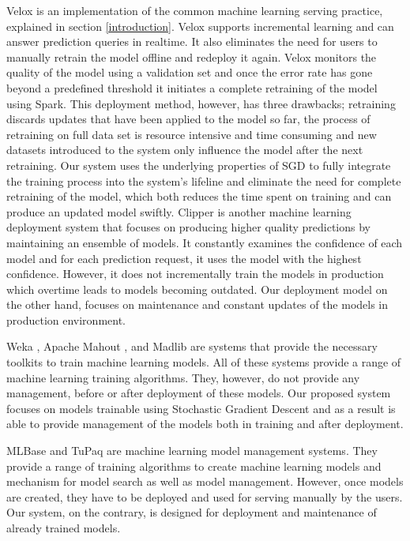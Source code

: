 \documentclass{vldb}
\begin{document}
Velox \cite{crankshaw2014missing} is an implementation of the common machine learning serving practice, explained in section \ref{introduction}.
Velox supports incremental learning and can answer prediction queries in realtime.
It also eliminates the need for users to manually retrain the model offline and redeploy it again.
Velox monitors the quality of the model using a validation set and once the error rate has gone beyond a predefined threshold it initiates a complete retraining of the model using Spark. 
This deployment method, however, has three drawbacks; retraining discards updates that have been applied to the model so far, the process of retraining on full data set is resource intensive and time consuming and new datasets introduced to the system only influence the model after the next retraining.
Our system uses the underlying properties of SGD to fully integrate the training process into the system's lifeline and eliminate the need for complete retraining of the model, which both reduces the time spent on training and can produce an updated model swiftly.
Clipper \cite{crankshaw2016clipper} is another machine learning deployment system that focuses on producing higher quality predictions by maintaining an ensemble of models.
It constantly examines the confidence of each model and for each prediction request, it uses the model with the highest confidence.
However, it does not incrementally train the models in production which overtime leads to models becoming outdated.
Our deployment model on the other hand, focuses on maintenance and constant updates of the models in production environment.

Weka \cite{hall2009weka}, Apache Mahout \cite{Owen:2011:MA:2132656}, and Madlib \cite{hellerstein2012madlib} are systems that provide the necessary toolkits to train machine learning models. All of these systems provide a range of machine learning training algorithms. 
They, however, do not provide any management, before or after deployment of these models. 
Our proposed system focuses on models trainable using Stochastic Gradient Descent and as a result is able to provide management of the models both in training and after deployment.

MLBase \cite{kraska2013mlbase} and TuPaq \cite{sparks2015tupaq} are machine learning model management systems.
They provide a range of training algorithms to create machine learning models and mechanism for model search as well as model management.
However, once models are created, they have to be deployed and used for serving manually by the users.
Our system, on the contrary, is designed for deployment and maintenance of already trained models.
\end{document}
